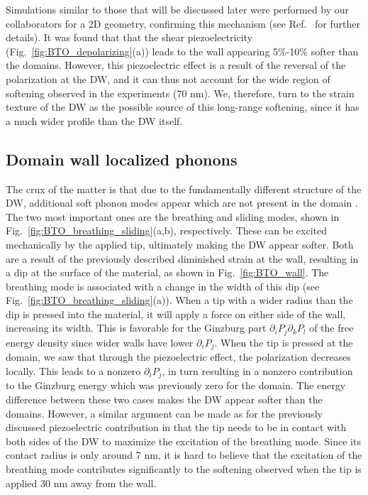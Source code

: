 Simulations similar to those that will be discussed later were performed by our collaborators for a 2D geometry, confirming this mechanism (see Ref.~\cite{Stefani2020} for further details).
It was found that that the shear piezoelectricity (Fig.~\ref{fig:BTO_depolarizing}(a)) leads to the wall appearing 5\%-10\% softer than the domains.
However, this piezoelectric effect is a result of the reversal of the polarization at the DW, and it can thus not account for the wide region of softening observed in the experiments (70 nm).
We, therefore, turn to the strain texture of the DW as the possible source of this long-range softening, since it has a much wider profile than the DW itself.

\subsection{Domain wall localized phonons}
The crux of the matter is that due to the fundamentally different structure of the DW, additional soft phonon modes appear which are not present in the domain \cite{Chen2020}.
The two most important ones are the breathing and sliding modes, shown in Fig.~\ref{fig:BTO_breathing_sliding}(a,b), respectively.
These can be excited mechanically by the applied tip, ultimately making the DW appear softer.
Both are a result of the previously described diminished strain at the wall, resulting in a dip at the surface of the material, as shown in Fig.~\ref{fig:BTO_wall}.
The breathing mode is associated with a change in the width of this dip (see Fig.~\ref{fig:BTO_breathing_sliding}(a)).
When a tip with a wider radius than the dip is pressed into the material, it will apply a force on either side of the wall, increasing its width.
This is favorable for the Ginzburg part $\partial_i P_j \partial_k P_l$ of the free energy density since wider walls have lower $\partial_i P_j$.
When the tip is pressed at the domain, we saw that through the piezoelectric effect, the polarization decreases locally.
This leads to a nonzero $\partial_i P_j$, in turn resulting in a nonzero contribution to the Ginzburg energy which was previously zero for the domain.
The energy difference between these two cases makes the DW appear softer than the domains.
However, a similar argument can be made as for the previously discussed piezoelectric contribution in that the tip needs to be in contact with both sides of the DW to maximize the excitation of the breathing mode.
Since its contact radius is only around 7 nm, it is hard to believe that the excitation of the breathing mode contributes significantly to the softening observed when the tip is applied 30 nm away from the wall.
